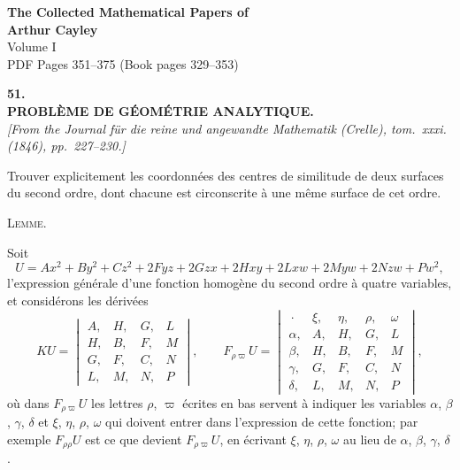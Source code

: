 \documentclass[11pt]{article}
\begin{document}
\begin{center}
{\LARGE\bfseries The Collected Mathematical Papers of}\\[0.5em]
{\LARGE\bfseries Arthur Cayley}\\[1em]
{\Large Volume I}\\[1em]
{\large PDF Pages 351--375 \quad (Book pages 329--353)}\\[2em]
\end{center}

\bigskip

\begin{center}
\textbf{\large 51.}\\[0.7em]
\textbf{\large PROBL\`EME DE G\'EOM\'ETRIE ANALYTIQUE.}\\[0.5em]
\textit{[From the Journal f\"ur die reine und angewandte Mathematik (Crelle), tom.~xxxi.\\
(1846), pp.~227--230.]}
\end{center}

\medskip

Trouver explicitement les coordonn\'ees des centres de similitude de deux surfaces du
second ordre, dont chacune est circonscrite \`a une m\^eme surface de cet ordre.

\medskip
\noindent\textsc{Lemme.}

\smallskip
\noindent Soit
\[
U = A x^{2} + B y^{2} + C z^{2} + 2 F y z + 2 G z x + 2 H x y + 2 L x w + 2 M y w + 2 N z w + P w^{2} \tag{1},
\]
l'expression g\'en\'erale d'une fonction homog\`ene du second ordre \`a quatre variables, et
consid\'erons les d\'eriv\'ees
\[
K U = \begin{vmatrix} A, & H, & G, & L \\ H, & B, & F, & M \\ G, & F, & C, & N \\ L, & M, & N, & P \end{vmatrix},
\qquad
F_{\rho\varpi} U = \begin{vmatrix} \,\cdot\, & \xi, & \eta, & \rho, & \omega \\ \alpha, & A, & H, & G, & L \\ \beta, & H, & B, & F, & M \\ \gamma, & G, & F, & C, & N \\ \delta, & L, & M, & N, & P \end{vmatrix} \tag{2},
\]
o\`u dans $F_{\rho\varpi}U$ les lettres $\rho$, $\varpi$ \'ecrites en bas servent \`a indiquer les variables $\alpha$, $\beta$, $\gamma$, $\delta$
et $\xi$, $\eta$, $\rho$, $\omega$ qui doivent entrer dans l'expression de cette fonction; par exemple
$F_{\rho\rho}U$ est ce que devient $F_{\rho\varpi}U$, en \'ecrivant $\xi$, $\eta$, $\rho$, $\omega$ au lieu de $\alpha$, $\beta$, $\gamma$, $\delta$.
\end{document}
